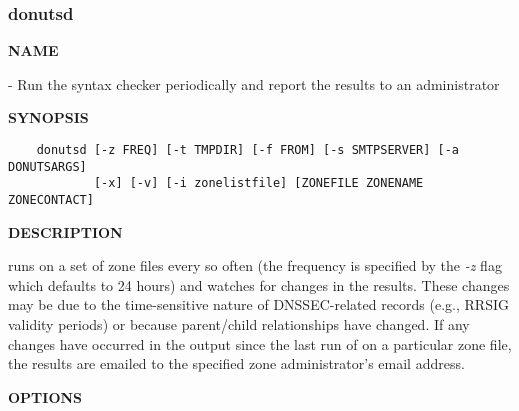 \clearpage

\subsubsection{donutsd}

{\bf NAME}

 - Run the  syntax checker periodically and report
the results to an administrator

{\bf SYNOPSIS}

\begin{verbatim}
    donutsd [-z FREQ] [-t TMPDIR] [-f FROM] [-s SMTPSERVER] [-a DONUTSARGS]
            [-x] [-v] [-i zonelistfile] [ZONEFILE ZONENAME ZONECONTACT]
\end{verbatim}

{\bf DESCRIPTION}

 runs  on a set of zone files every so often (the
frequency is specified by the {\it -z} flag which defaults to 24 hours) and
watches for changes in the results.  These changes may be due to the
time-sensitive nature of DNSSEC-related records (e.g., RRSIG validity
periods) or because parent/child relationships have changed.  If any
changes have occurred in the output since the last run of  on a
particular zone file, the results are emailed to the specified zone
administrator's email address.

{\bf OPTIONS}

